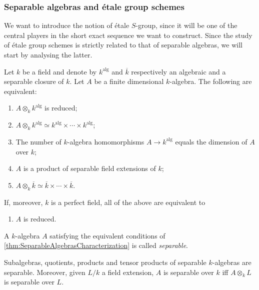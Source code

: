 \subsubsection{Separable algebras and étale group schemes}
We want to introduce the notion of étale \(S\)-group, since it will
be one of the central players in the short exact sequence we want to construct.
Since the study of étale group schemes is strictly related to that of
separable algebras, we will start by analysing the latter.


\begin{thm}
	\label{thm:SeparableAlgebrasCharacterization}
	Let $k$ be a field and denote by $k^{ \operatorname{alg} }$ and $\overline{k}$ respectively
	an algebraic and a separable closure of $k$.
	Let $A$ be a finite dimensional $k$-algebra.
	The following are equivalent:
\begin{enumerate}
	\item $A \otimes_k k^{ \operatorname{alg} }$ is reduced;
	\item $A \otimes_k k^{ \operatorname{alg} } \simeq 
		k^{ \operatorname{alg} }\times \dotsb \times k^{ \operatorname{alg} }$;
	\item The number of $k$-algebra homomorphisms $A \to  k^{ \operatorname{alg} }$
		equals the dimension of $A$ over $k$;
	\item $A$ is a product of separable field extensions of $k$;
	\item $A \otimes_k \overline{k} \simeq \overline{k} \times \cdots \times \overline{k}$.
\end{enumerate}
If, moreover, $k$ is a perfect field, all of the above are equivalent to
\begin{enumerate}[resume]
	\item $A$ is reduced.
\end{enumerate}
\end{thm}


\begin{defn}
	A $k$-algebra $A$ satisfying the equivalent conditions of
	\cref{thm:SeparableAlgebrasCharacterization}
	is called \emph{separable}.
\end{defn}


\begin{cor}
	Subalgebras, quotients, products and tensor products of separable $k$-algebras
	are separable.
	Moreover, given $L/k$ a field extension, $A$ is separable over $k$
	iff $A \otimes_k L$ is separable over $L$.
\end{cor} 



